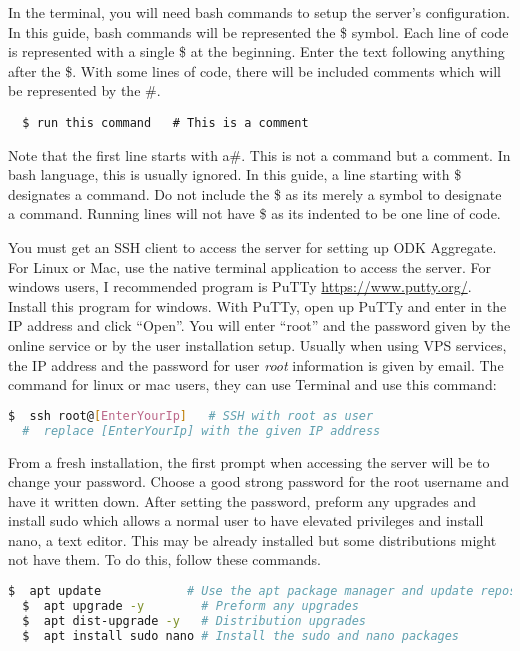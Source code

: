 \noindent
In the terminal, you will need bash commands to setup the server's configuration. In this guide, bash commands will be represented the \$ symbol. Each line of code is represented with a single \$ at the beginning. Enter the text following anything after the \$. With some lines of code, there will be included comments which will be represented by the \#.

\begin{lstlisting}
  $ run this command   # This is a comment
\end{lstlisting}

\noindent
Note that the first line starts with a\#. This is not a command but a comment. In bash language, this is usually ignored. In this guide, a line starting with \$ designates a command. Do not include the \$ as its merely a symbol to designate a command. Running lines will not have \$ as its indented to be one line of code.


\noindent
You must get an SSH client to access the server for setting up ODK Aggregate. For Linux or Mac, use the native terminal application to access the server. For windows users, I recommended program is PuTTy \url{https://www.putty.org/}. Install this program for windows. With PuTTy, open up PuTTy and enter in the IP address and click ``Open''. You will enter ``root'' and the password given by the online service or by the user installation setup.  Usually when using VPS services, the IP address and the password for user \emph{root} information is given by email.
\noindent
The command for linux or mac users, they can use Terminal and use this command:
\begin{lstlisting}[language=bash]
  $  ssh root@[EnterYourIp]   # SSH with root as user
  #  replace [EnterYourIp] with the given IP address
\end{lstlisting}

\noindent
From a fresh installation, the first prompt when accessing the server will be to change your password. Choose a good strong password for the root username and have it written down.  After setting the password, preform any upgrades and install sudo which allows a normal user to have elevated privileges and install nano, a text editor. This may be already installed but some distributions might not have them. To do this, follow these commands.

\begin{lstlisting}[language=bash]
  $  apt update            # Use the apt package manager and update repository
  $  apt upgrade -y        # Preform any upgrades
  $  apt dist-upgrade -y   # Distribution upgrades
  $  apt install sudo nano # Install the sudo and nano packages
\end{lstlisting}

